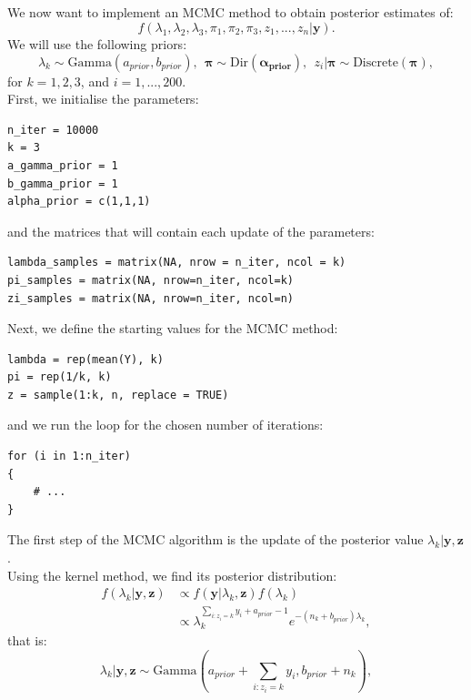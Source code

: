 \documentclass[a4paper,12pt]{article}
\begin{document}
\subsection{}
We now want to implement an MCMC method to obtain posterior estimates of:
\begin{equation*}
    f(\lambda_1,\lambda_2,\lambda_3,\pi_1,\pi_2,\pi_3,z_1,...,z_n|\mathbf{y}).
\end{equation*}
We will use the following priors:
\begin{equation*}
    \lambda_k \sim \text{Gamma}(a_{prior},b_{prior}), \ \  \boldsymbol{\pi} \sim \text{Dir}(\boldsymbol{\alpha_{prior}}), \ \ z_i|\boldsymbol{\pi} \sim \text{Discrete}(\boldsymbol{\pi}),
\end{equation*}
for \(k = 1,2,3\), and \(i = 1,...,200\). \\
First, we initialise the parameters:
\begin{lstlisting}[style=R]
n_iter = 10000
k = 3
a_gamma_prior = 1
b_gamma_prior = 1
alpha_prior = c(1,1,1)
\end{lstlisting}
and the matrices that will contain each update of the parameters:
\begin{lstlisting}[style=R]
lambda_samples = matrix(NA, nrow = n_iter, ncol = k)
pi_samples = matrix(NA, nrow=n_iter, ncol=k)
zi_samples = matrix(NA, nrow=n_iter, ncol=n)
\end{lstlisting}
Next, we define the starting values for the MCMC method:
\begin{lstlisting}[style=R]
lambda = rep(mean(Y), k)
pi = rep(1/k, k)
z = sample(1:k, n, replace = TRUE)
\end{lstlisting}
and we run the loop for the chosen number of iterations:
\begin{lstlisting}[style=R]
for (i in 1:n_iter)
{
    # ...
}
\end{lstlisting}
The first step of the MCMC algorithm is the update of the posterior value \(\lambda_k|\mathbf{y},\mathbf{z}\). \\
Using the kernel method, we find its posterior distribution:
\begin{align*}
    f(\lambda_k|\mathbf{y},\mathbf{z}) &\propto f(\mathbf{y}|\lambda_k,\mathbf{z}) f(\lambda_k) \\
    &\propto \lambda_k^{\sum_{i: z_i = k} y_i + a_{prior} - 1} e^{-(n_k + b_{prior}) \lambda_k},
\end{align*}
that is:
\begin{equation*}
    \lambda_k|\mathbf{y},\mathbf{z} \sim \text{Gamma}\left(a_{prior} + \sum_{i: z_i = k} y_i, b_{prior} + n_k \right),
\end{equation*}
\end{document}
